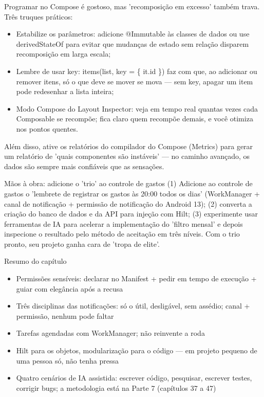 
Programar no Compose é gostoso, mas 'recomposição em excesso' também trava. Três truques práticos:

\begin{itemize}
  \item Estabilize os parâmetros: adicione @Immutable às classes de dados ou use derivedStateOf para evitar que mudanças de estado sem relação disparem recomposição em larga escala;
  \item Lembre de usar key: items(list, key = \{ it.id \}) faz com que, ao adicionar ou remover itens, só o que deve se mover se mova — sem key, apagar um item pode redesenhar a lista inteira;
  \item Modo Compose do Layout Inspector: veja em tempo real quantas vezes cada Composable se recompõe; fica claro quem recompõe demais, e você otimiza nos pontos quentes.
\end{itemize}

Além disso, ative os relatórios do compilador do Compose (Metrics) para gerar um relatório de 'quais componentes são instáveis' — no caminho avançado, os dados são sempre mais confiáveis que as sensações.

\begin{tcbpractice}{Mãos à obra: adicione o 'trio' ao controle de gastos}
(1) Adicione ao controle de gastos o 'lembrete de registrar os gastos às 20:00 todos os dias' (WorkManager + canal de notificação + permissão de notificação do Android 13); (2) converta a criação do banco de dados e da API para injeção com Hilt; (3) experimente usar ferramentas de IA para acelerar a implementação do 'filtro mensal' e depois inspecione o resultado pelo método de aceitação em três níveis. Com o trio pronto, seu projeto ganha cara de 'tropa de elite'.

\end{tcbpractice}

\begin{tcbsummary}{Resumo do capítulo}
\begin{itemize}
  \item Permissões sensíveis: declarar no Manifest + pedir em tempo de execução + guiar com elegância após a recusa
  \item Três disciplinas das notificações: só o útil, desligável, sem assédio; canal + permissão, nenhum pode faltar
  \item Tarefas agendadas com WorkManager; não reinvente a roda
  \item Hilt para os objetos, modularização para o código — em projeto pequeno de uma pessoa só, não tenha pressa
  \item Quatro cenários de IA assistida: escrever código, pesquisar, escrever testes, corrigir bugs; a metodologia está na Parte 7 (capítulos 37 a 47)
\end{itemize}

\end{tcbsummary}
